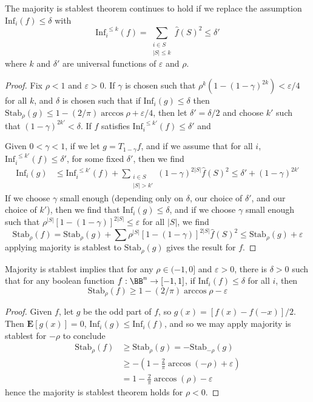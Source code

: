 \begin{theorem}
    The majority is stablest theorem continues to hold if we replace the assumption $\text{Inf}_i(f) \leq \delta$ with
    \[ \text{Inf}_i^{\ \leq k}(f) = \sum_{\substack{i \in S\\|S| \leq k}} \widehat{f}(S)^2 \leq \delta' \]
    where $k$ and $\delta'$ are universal functions of $\varepsilon$ and $\rho$.
\end{theorem}
\begin{proof}
    Fix $\rho < 1$ and $\varepsilon > 0$. If $\gamma$ is chosen such that $\rho^k(1 - (1 - \gamma)^{2k}) < \varepsilon/4$ for all $k$, and $\delta$ is chosen such that if $\text{Inf}_i(g) \leq \delta$ then $\text{Stab}_\rho(g) \leq 1 - (2/\pi) \arccos \rho + \varepsilon/4$, then let $\delta' = \delta/2$ and choose $k'$ such that $(1 - \gamma)^{2k'} < \delta$. If $f$ satisfies $\text{Inf}_i^{\ \leq k'}(f) \leq \delta'$ and

    Given $0 < \gamma < 1$, if we let $g = T_{1 - \gamma} f$, and if we assume that for all $i$, $\text{Inf}_i^{\ \leq k'}(f) \leq \delta'$, for some fixed $\delta'$, then we find
    \begin{align*}
        \text{Inf}_i(g) &\leq \text{Inf}_i^{\ \leq k'}(f) + \sum_{\substack{i \in S\\|S| > k'}} (1 - \gamma)^{2|S|} \widehat{f}(S)^2 \leq \delta' + (1 - \gamma)^{2k'}
    \end{align*}
    If we choose $\gamma$ small enough (depending only on $\delta$, our choice of $\delta'$, and our choice of $k'$), then we find that $\text{Inf}_i(g) \leq \delta$, and if we choose $\gamma$ small enough such that $\rho^{|S|} [1 - (1 - \gamma)]^{2|S|} \leq \varepsilon$ for all $|S|$, we find
    \[ \text{Stab}_\rho(f) = \text{Stab}_\rho(g) + \sum \rho^{|S|} [1 - (1 - \gamma)]^{2|S|} \widehat{f}(S)^2 \leq \text{Stab}_\rho(g) + \varepsilon \]
    applying majority is stablest to $\text{Stab}_\rho(g)$ gives the result for $f$.
\end{proof}

\begin{theorem}
    Majority is stablest implies that for any $\rho \in (-1,0]$ and $\varepsilon > 0$, there is $\delta > 0$ such that for any boolean function $f: \BB^n \to [-1,1]$, if $\text{Inf}_i(f) \leq \delta$ for all $i$, then
    \[ \text{Stab}_\rho(f) \geq 1 - (2/\pi) \arccos \rho - \varepsilon \]
\end{theorem}
\begin{proof}
    Given $f$, let $g$ be the odd part of $f$, so $g(x) = [f(x) - f(-x)]/2$. Then $\mathbf{E}[g(x)] = 0$, $\text{Inf}_i(g) \leq \text{Inf}_i(f)$, and so we may apply majority is stablest for $-\rho$ to conclude
    \begin{align*}
        \text{Stab}_\rho(f) &\geq \text{Stab}_\rho(g) = -\text{Stab}_{-\rho}(g)\\
        &\geq - \left( 1 - \frac{2}{\pi} \arccos(-\rho) + \varepsilon \right)\\
        &= 1 - \frac{2}{\pi} \arccos(\rho) - \varepsilon
    \end{align*}
    hence the majority is stablest theorem holds for $\rho < 0$.
\end{proof}

